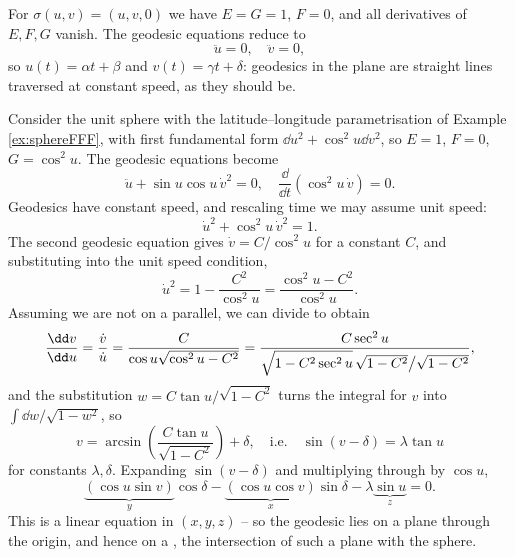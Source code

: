 \begin{example}
    For $\sigma(u, v) = (u, v, 0)$ we have $E = G = 1$, $F = 0$, and all derivatives of $E, F, G$ vanish. The geodesic equations reduce to
    $$
    \ddot u = 0, \quad \ddot v = 0,
    $$
    so $u(t) = \alpha t + \beta$ and $v(t) = \gamma t + \delta$: geodesics in the plane are straight lines traversed at constant speed, as they should be.
\end{example}

\begin{example}\label{ex:spheregeodesics}
    Consider the unit sphere with the latitude--longitude parametrisation of Example \ref{ex:sphereFFF}, with first fundamental form $\dd u^2 + \cos^2 u \dd v^2$, so $E = 1$, $F = 0$, $G = \cos^2 u$. The geodesic equations become
    $$
    \ddot u + \sin u \cos u \, \dot v^2 = 0, \quad \frac{\dd}{\dd t}\left(\cos^2 u \, \dot v\right) = 0.
    $$
    Geodesics have constant speed, and rescaling time we may assume unit speed:
    $$
    \dot u^2 + \cos^2 u \, \dot v^2 = 1.
    $$
    The second geodesic equation gives $\dot v = C/\cos^2 u$ for a constant $C$, and substituting into the unit speed condition,
    $$
    \dot u^2 = 1 - \frac{C^2}{\cos^2 u} = \frac{\cos^2 u - C^2}{\cos^2 u}.
    $$
    Assuming we are not on a parallel, we can divide to obtain
    $$
    \frac{\dd v}{\dd u} = \frac{\dot v}{\dot u} = \frac{C}{\cos u \sqrt{\cos^2 u - C^2}} = \frac{C \sec^2 u}{\sqrt{1 - C^2\sec^2 u \vphantom{\big(}}\,\sqrt{1 - C^2}\big/\sqrt{1 - C^2}},
    $$
    and the substitution $w = C \tan u / \sqrt{1 - C^2}$ turns the integral for $v$ into $\int \dd w/\sqrt{1 - w^2}$, so
    $$
    v = \arcsin\left(\frac{C \tan u}{\sqrt{1 - C^2}}\right) + \delta, \quad \text{i.e.} \quad \sin(v - \delta) = \lambda \tan u
    $$
    for constants $\lambda, \delta$. Expanding $\sin(v - \delta)$ and multiplying through by $\cos u$,
    $$
    \underbrace{(\cos u \sin v)}_{y} \cos\delta - \underbrace{(\cos u \cos v)}_{x}\sin \delta - \lambda \underbrace{\sin u}_{z} = 0.
    $$
    This is a linear equation in $(x, y, z)$ -- so the geodesic lies on a plane through the origin, and hence on a , the intersection of such a plane with the sphere.
    \begin{center}
\end{center}
\end{example}
